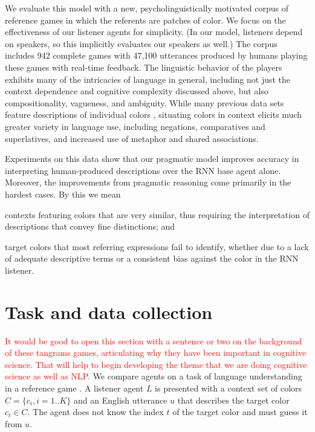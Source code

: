 \documentclass[11pt,letterpaper]{article}
\newcommand{\Listener}{L}
\newcommand{\utt}{u}
\newcommand{\referent}{c}
\newcommand{\context}{C}
\newcommand{\contextlen}{K}
\newcommand{\target}{t}
\renewcommand{\|}{\mid}
\newcommand{\todocheck}[1]{\textcolor{red}{#1}}
\begin{document}
We evaluate this model with a new, psycholinguistically motivated corpus of reference games in which
the referents are patches of color. We focus on the effectiveness of
our listener agents for simplicity. (In our model, listeners depend on
speakers, so this implicitly evaluates our speakers as well.) The
corpus includes 942 complete games with 47,100 utterances produced by
humans playing these games with real-time feedback. The linguistic
behavior of the players exhibits many of the intricacies of language
in general, including not just the context dependence and cognitive
complexity discussed above, but also compositionality, vagueness, and
ambiguity. While many previous data sets feature descriptions of
individual colors \cite{Cook2005,Munroe2010,Kawakami2016}, situating
colors in context elicits much greater variety in language use,
including negations, comparatives and superlatives, and increased use
of metaphor and shared associations.

Experiments on this data show that our pragmatic model improves accuracy
in interpreting human-produced descriptions over the RNN base agent
alone. Moreover, the improvements from pragmatic reasoning come primarily
in the hardest cases. By this we mean
%
\begin{enumerate*}[label=(\arabic*)]
\item contexts featuring colors that are very similar, thus requiring
  the interpretation of descriptions that convey fine distinctions;
  and
\item target colors that most referring expressions fail to identify,
  whether due to a lack of adequate descriptive terms or a consistent
  bias against the color in the RNN listener.
\end{enumerate*}


\section{Task and data collection}\label{sec:corpus}

\todocheck{It would be good to open this section with a sentence or
  two on the background of these tangrams games, articulating why
  they have been important in cognitive science. That will help to
  begin developing the theme that we are doing cognitive science as
  well as NLP.}
We compare agents on a task of language understanding in a reference
game \cite{Rosenberg:Cohen:1964,Clark:Wilkes-Gibbs:1986,Paetzel-etal:2014}.
A listener agent $\Listener$ is presented with a context set of colors
$\context = \{\referent_{i}, i=1..\contextlen\}$ and an English
utterance $\utt$ that describes the target color
$\referent_{\target} \in \context$. The agent does not know the index
$\target$ of the target color and must guess it from $\utt$.
\end{document}
